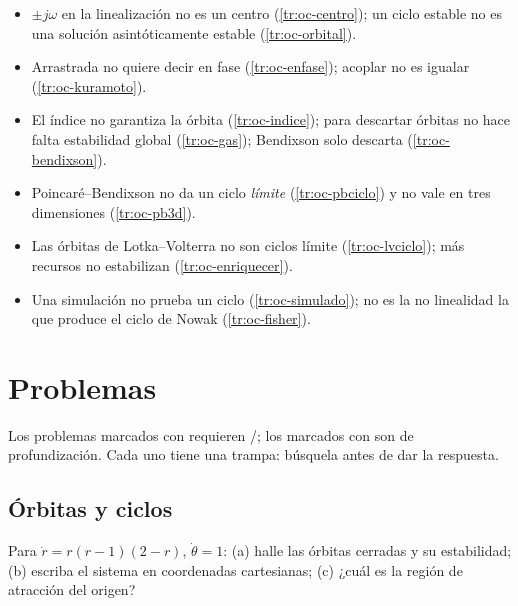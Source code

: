 \begin{trampa}[title={\faBug\hspace{0.45em}Las trampas del capítulo, en una caja}]{}
\begin{itemize}
  \item $\pm j\omega$ en la linealización no es un centro (\cref{tr:oc-centro}); un ciclo estable no es una solución asintóticamente estable (\cref{tr:oc-orbital}).
  \item Arrastrada no quiere decir en fase (\cref{tr:oc-enfase}); acoplar no es igualar (\cref{tr:oc-kuramoto}).
  \item El índice no garantiza la órbita (\cref{tr:oc-indice}); para descartar órbitas no hace falta estabilidad global (\cref{tr:oc-gas}); Bendixson solo descarta (\cref{tr:oc-bendixson}).
  \item Poincaré--Bendixson no da un ciclo \emph{límite} (\cref{tr:oc-pbciclo}) y no vale en tres dimensiones (\cref{tr:oc-pb3d}).
  \item Las órbitas de Lotka--Volterra no son ciclos límite (\cref{tr:oc-lvciclo}); más recursos no estabilizan (\cref{tr:oc-enriquecer}).
  \item Una simulación no prueba un ciclo (\cref{tr:oc-simulado}); no es la no linealidad la que produce el ciclo de Nowak (\cref{tr:oc-fisher}).
\end{itemize}
\end{trampa}

\section{Problemas}
\label{sec:oc-problemas}

Los problemas marcados con \etiquetaM{} requieren \matlab/\simulink; los marcados con \etiquetaEstrella{} son de profundización. Cada uno tiene una trampa: búsquela antes de dar la respuesta.

\subsection*{Órbitas y ciclos}

\begin{problema}\label{prob:oc-polar2}
Para $\dot r=r(r-1)(2-r)$, $\dot\theta=1$: (a) halle las órbitas cerradas y su estabilidad; (b) escriba el sistema en coordenadas cartesianas; (c) ¿cuál es la región de atracción del origen?
\end{problema}

